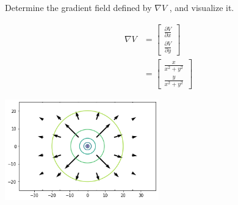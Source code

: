 Determine the gradient field defined by $\nabla V$ , and visualize it.

\begin{solution}
\begin{align*}
    \nabla V &= \begin{bmatrix} \frac{\partial V}{\partial x} \\ \frac{\partial V}{\partial y} \end{bmatrix} \\
    &= \begin{bmatrix}
        \frac{x}{x^2+y^2} \\
        \frac{y}{x^2+y^2}
    \end{bmatrix}
\end{align*}

\begin{center}
    \includegraphics[width=0.5\textwidth]{img/e9p3.png}
\end{center}
\end{solution}
